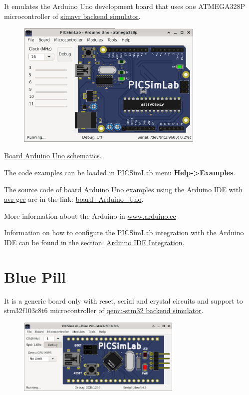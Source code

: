 It emulates the Arduino Uno development board that uses one ATMEGA328P microcontroller of
\hyperlink{def:simavr}{simavr backend simulator}.

\begin{figure}[H]
\center
\includegraphics[width=0.80\textwidth]{img/picsimlab5.png} 
\end{figure} 

\href{https://www.arduino.cc/en/uploads/Main/Arduino_Uno_Rev3-schematic.pdf}{Board Arduino Uno schematics}.\vspace{0.5cm}

The code examples can be loaded in PICSimLab menu \textbf{Help->Examples}.

The source code of board Arduino Uno examples using the 
\href{https://www.arduino.cc/en/Main/Software}{Arduino IDE with avr-gcc} are in the link: 
\href{https://lcgamboa.github.io/picsimlab_examples/board_Arduino_Uno.html}{board\_Arduino\_Uno}.

More information about the Arduino in \href{https://www.arduino.cc/}{www.arduino.cc}

Information on how to configure the PICSimLab integration with the Arduino IDE can be found in the 
section: \hyperlink{def:arduinoide}{Arduino IDE Integration}.

\section{Blue Pill}

It is a generic board only with reset, serial and crystal circuits and support to stm32f103c8t6 microcontroller of 
\hyperlink{def:qemu-stm32}{qemu-stm32 backend simulator}.

\begin{figure}[H]
\center
\includegraphics[width=0.7\textwidth]{img/Blue_Pill.png} 
\end{figure} 


